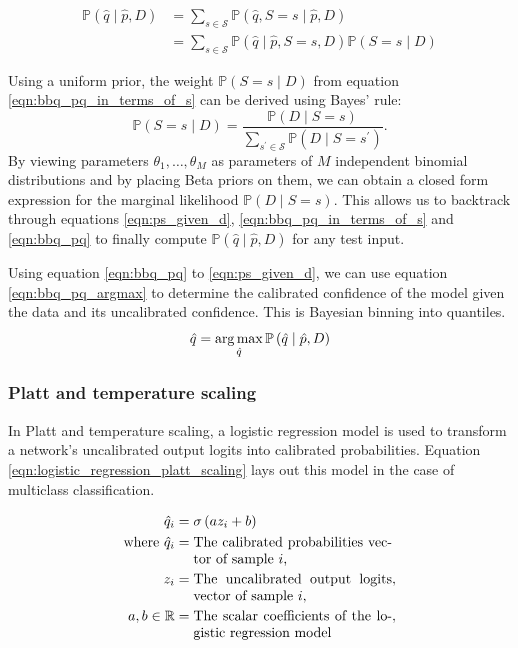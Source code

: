 \begin{align}
\label{eqn:bbq_pq}
\mathbb{P}\left(\hat{q} \mid \hat{p}, D\right) &= \sum_{s \in \mathcal{S}} \mathbb{P}\left(\hat{q}, S=s \mid \hat{p}, D\right) \\
\label{eqn:bbq_pq_in_terms_of_s}
&= \sum_{s \in \mathcal{S}} \mathbb{P}\left(\hat{q} \mid \hat{p}, S=s, D\right) \mathbb{P}(S=s \mid D)
\end{align}

Using a uniform prior, the weight $\mathbb{P}(S=s \mid D)$ from equation \ref{eqn:bbq_pq_in_terms_of_s} can be derived using Bayes' rule:
\begin{equation}
\label{eqn:ps_given_d}
\mathbb{P}(S=s \mid D)=\frac{\mathbb{P}(D \mid S=s)}{\sum_{s^{\prime} \in \mathcal{S}} \mathbb{P}\left(D \mid S=s^{\prime}\right)}.
\end{equation}
By viewing parameters $\theta_{1}, \ldots, \theta_{M}$ as parameters of $M$ independent binomial distributions and by placing Beta priors on them, we can obtain a closed form expression for the marginal likelihood $\mathbb{P}(D \mid S=s)$. This allows us to backtrack through equations \ref{eqn:ps_given_d}, \ref{eqn:bbq_pq_in_terms_of_s} and \ref{eqn:bbq_pq} to finally compute $\mathbb{P}\left(\hat{q} \mid \hat{p}, D\right)$ for any test input.

Using equation \ref{eqn:bbq_pq} to \ref{eqn:ps_given_d}, we can use equation \ref{eqn:bbq_pq_argmax} to determine the calibrated confidence of the model given the data and its uncalibrated confidence. This is Bayesian binning into quantiles.
\begin{equation}
\label{eqn:bbq_pq_argmax}
\hat{q} = \operatorname*{arg\,max}_{\hat{q}} \mathbb{P}\left(\hat{q} \mid \hat{p}, D\right)
\end{equation}

\subsubsection{Platt and temperature scaling}
In Platt and temperature scaling, a logistic regression model is used to transform a network's uncalibrated output logits into calibrated probabilities. Equation \ref{eqn:logistic_regression_platt_scaling} lays out this model in the case of multiclass classification.

\begin{align}
\label{eqn:logistic_regression_platt_scaling}
\hat{q}_{i} &= \sigma\left(a z_{i} + b\right) \\ \nonumber
\text{where}~\hat{q}_{i} &= \parbox[t]{5cm}{The calibrated probabilities vector of sample $i$,} \\ \nonumber
z_{i} &= \parbox[t]{5cm}{The uncalibrated output logits vector of sample $i$,}, \\ \nonumber
a, b \in \mathbb{R} &= \parbox[t]{5cm}{The scalar coefficients of the logistic regression model}, \\ \nonumber
\end{align}

